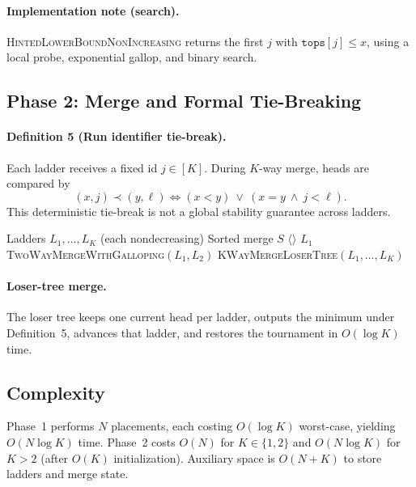 \documentclass[10pt]{article}
\begin{document}
\paragraph{Implementation note (search).}
\textsc{HintedLowerBoundNonIncreasing} returns the first \(j\) with \(\texttt{tops}[j]\le x\), using a local probe, exponential gallop, and binary search.

\subsection{\textbf{Phase 2: Merge and Formal Tie-Breaking}}

\paragraph{Definition 5 (Run identifier tie-break).}
Each ladder receives a fixed id \(j\in[K]\). During \(K\)-way merge, heads are compared by
\[
(x,j) \prec (y,\ell) \iff (x<y)\ \lor\ (x=y\ \wedge\ j<\ell).
\]
This deterministic tie-break is not a global stability guarantee across ladders.


\begin{algorithm}[H]
\caption{\textsc{MergeByK}$(L_1,\dots,L_K)$}
\label{alg:mergebyk}
\begin{algorithmic}[1]
\Require Ladders $L_1,\dots,L_K$ (each nondecreasing)
\Ensure Sorted merge $S$
 \State \Return $\langle\rangle$ \EndIf
{} \State \Return $L_1$ \EndIf
{} \State \Return \textsc{TwoWayMergeWithGalloping}$(L_1,L_2)$ \EndIf
\State \Return \textsc{KWayMergeLoserTree}$(L_1,\dots,L_K)$ 
\end{algorithmic}
\end{algorithm}

\paragraph{Loser-tree merge.}
The loser tree keeps one current head per ladder, outputs the minimum under Definition~5, advances that ladder, and restores the tournament in \(O(\log K)\) time.

\subsection{\textbf{Complexity}}
Phase~1 performs $N$ placements, each costing $O(\log K)$ worst-case, yielding $O(N\log K)$ time.
Phase~2 costs $O(N)$ for $K\in\{1,2\}$ and $O(N\log K)$ for $K>2$ (after $O(K)$ initialization).
Auxiliary space is $O(N+K)$ to store ladders and merge state.
\end{document}
